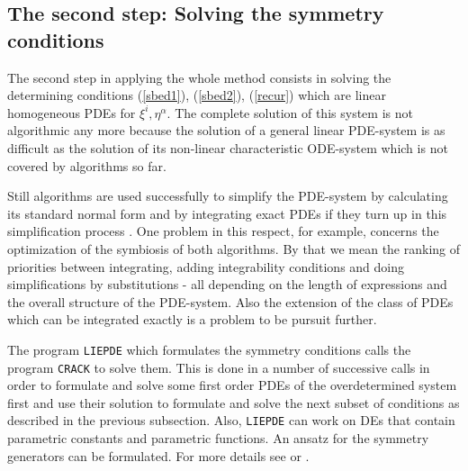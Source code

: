 \subsection{The second step: Solving the symmetry conditions}
The second step in applying the whole method consists in solving the
determining conditions (\ref{sbed1}), (\ref{sbed2}), (\ref{recur})
which are linear homogeneous PDEs for $\xi^i, \eta^\alpha$. The
complete solution of this system is not algorithmic any more because the
solution of a general linear PDE-system is as difficult as the solution of
its non-linear characteristic ODE-system which is not covered by algorithms
so far.

Still algorithms are used successfully to simplify the PDE-system by
calculating
its standard normal form and by integrating exact PDEs
if they turn up in this simplification process \cite{LIEPDE}.
One problem in this respect, for example,
concerns the optimization of the symbiosis of both algorithms. By that we
mean the ranking of priorities between integrating, adding integrability
conditions and doing simplifications by substitutions - all depending on
the length of expressions and the overall structure of the PDE-system.
Also the extension of the class of PDEs which can be integrated exactly is
a problem to be pursuit further.

The program {\tt LIEPDE} which formulates the symmetry conditions calls the
program {\tt CRACK} to solve them. This is done in a number of successive
calls in order to formulate and solve some first order PDEs of the
overdetermined system first and use their solution to formulate and solve the
next subset of conditions as described in the previous subsection.
Also, {\tt LIEPDE} can work on DEs that contain parametric constants and
parametric functions. An ansatz for the symmetry generators can be
formulated. For more details see \cite{LIEPDE} or \cite{WoBra}.


